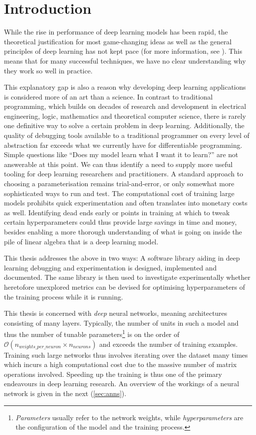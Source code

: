 \chapter{Introduction}\label{sec:introduction}

While the rise in performance of deep learning models has been rapid, the theoretical
justification for most game-changing ideas as well as the general principles of
deep learning has not kept pace (for more information, see \cite{arora2018}).
This means that for many successful techniques, we have no clear understanding
why they work so well in practice.

This explanatory gap is also a reason why developing deep learning applications
is considered more of an art than a science. In contrast to traditional
programming, which builds on decades of research and development in electrical
engineering, logic, mathematics and theoretical computer science, there is rarely
one definitive way to solve a certain problem in deep learning.  Additionally,
the quality of debugging tools available to a traditional programmer on every level of
abstraction far exceeds what we currently have for differentiable programming.
Simple questions like ``Does my model learn what I want it to learn?'' are not
answerable at this point.  We can thus identify a need to supply more useful
tooling for deep learning researchers and practitioners.  A standard approach to
choosing a parameterisation remains trial-and-error, or only somewhat more
sophisticated ways to run and test.  The computational cost of training large
models prohibits quick experimentation and often translates into monetary costs
as well.  Identifying dead ends early or points in training at which to tweak
certain hyperparameters could thus provide large savings in time and money, besides
enabling a more thorough understanding of what is going on inside the pile of
linear algebra that is a deep learning model.

This thesis addresses the above in two ways: A software library aiding in deep
learning debugging and experimentation is designed, implemented and documented. The same
library is then used to investigate experimentally whether heretofore unexplored
metrics can be devised for optimising hyperparameters of the training process while it is running.

This thesis is concerned with \emph{deep} neural networks, meaning architectures
consisting of many layers. Typically, the number of units in such a model and
thus the number of tunable parameters\footnote{\emph{Parameters} usually refer
to the network weights, while \emph{hyperparameters} are the configuration of
the model and the training process.} is on the order of
$\mathcal{O}(n_{weights\_per\_neuron} \times n_{neurons})$ and exceeds the number of
training examples. Training such large networks thus involves iterating over the
dataset many times which incurs a high computational cost due to the massive
number of matrix operations involved. Speeding up the training is thus one of
the primary endeavours in deep learning research. An overview of the workings of
a neural network is given in the next (\cref{sec:anns}).

